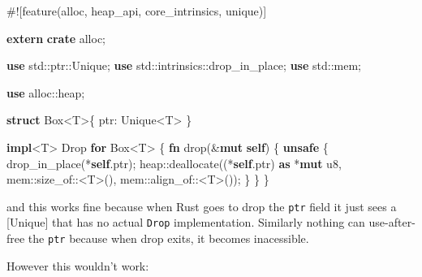 \documentclass[a4paper,]{book}
\newenvironment{Shaded}{\begin{snugshade}}{\end{snugshade}}
\newcommand{\KeywordTok}[1]{\textcolor[rgb]{0.13,0.29,0.53}{\textbf{{#1}}}}
\newcommand{\DataTypeTok}[1]{\textcolor[rgb]{0.13,0.29,0.53}{{#1}}}
\newcommand{\BuiltInTok}[1]{{#1}}
\newcommand{\AttributeTok}[1]{\textcolor[rgb]{0.77,0.63,0.00}{{#1}}}
\newcommand{\NormalTok}[1]{{#1}}
\begin{document}
\begin{Shaded}
\begin{Highlighting}[]
\AttributeTok{#![}\NormalTok{feature}\AttributeTok{(}\NormalTok{alloc}\AttributeTok{,} \NormalTok{heap_api}\AttributeTok{,} \NormalTok{core_intrinsics}\AttributeTok{,} \NormalTok{unique}\AttributeTok{)]}

\KeywordTok{extern} \KeywordTok{crate} \NormalTok{alloc;}

\KeywordTok{use} \NormalTok{std::ptr::Unique;}
\KeywordTok{use} \NormalTok{std::intrinsics::drop_in_place;}
\KeywordTok{use} \NormalTok{std::mem;}

\KeywordTok{use} \NormalTok{alloc::heap;}

\KeywordTok{struct} \DataTypeTok{Box}\NormalTok{<T>\{ ptr: Unique<T> \}}

\KeywordTok{impl}\NormalTok{<T> }\BuiltInTok{Drop} \KeywordTok{for} \DataTypeTok{Box}\NormalTok{<T> \{}
    \KeywordTok{fn} \NormalTok{drop(&}\KeywordTok{mut} \KeywordTok{self}\NormalTok{) \{}
        \KeywordTok{unsafe} \NormalTok{\{}
            \NormalTok{drop_in_place(*}\KeywordTok{self}\NormalTok{.ptr);}
            \NormalTok{heap::deallocate((*}\KeywordTok{self}\NormalTok{.ptr) }\KeywordTok{as} \NormalTok{*}\KeywordTok{mut} \DataTypeTok{u8}\NormalTok{,}
                             \NormalTok{mem::size_of::<T>(),}
                             \NormalTok{mem::align_of::<T>());}
        \NormalTok{\}}
    \NormalTok{\}}
\NormalTok{\}}
\end{Highlighting}
\end{Shaded}

and this works fine because when Rust goes to drop the \texttt{ptr}
field it just sees a {[}Unique{]} that has no actual \texttt{Drop}
implementation. Similarly nothing can use-after-free the \texttt{ptr}
because when drop exits, it becomes inacessible.

However this wouldn't work:
\end{document}
